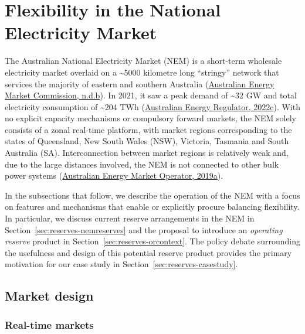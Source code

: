 \documentclass[12pt,a4paper,]{report}
\begin{document}
\hypertarget{sec:reserves-flexnem}{%
\section{Flexibility in the National Electricity
Market}\label{sec:reserves-flexnem}}

The Australian National Electricity Market (NEM) is a short-term
wholesale electricity market overlaid on a \textasciitilde5000 kilometre
long ``stringy'' network that services the majority of eastern and
southern Australia
(\protect\hyperlink{ref-australianenergymarketcommissionElectricitySupplyChain}{Australian
Energy Market Commission, n.d.b}). In 2021, it saw a peak demand of
\textasciitilde32 GW and total electricity consumption of
\textasciitilde204 TWh
(\protect\hyperlink{ref-australianenergyregulatorStateEnergyMarket2022}{Australian
Energy Regulator, 2022c}). With no explicit capacity mechanisms or
compulsory forward markets, the NEM solely consists of a zonal real-time
platform, with market regions corresponding to the states of Queensland,
New South Wales (NSW), Victoria, Tasmania and South Australia (SA).
Interconnection between market regions is relatively weak and, due to
the large distances involved, the NEM is not connected to other bulk
power systems
(\protect\hyperlink{ref-australianenergymarketoperatorMaintainingPowerSystem2019}{Australian
Energy Market Operator, 2019a}).

In the subsections that follow, we describe the operation of the NEM
with a focus on features and mechanisms that enable or explicitly
procure balancing flexibility. In particular, we discuss current reserve
arrangements in the NEM in Section~\ref{sec:reserves-nemreserves} and
the proposal to introduce an \emph{operating reserve} product in
Section~\ref{sec:reserves-orcontext}. The policy debate surrounding the
usefulness and design of this potential reserve product provides the
primary motivation for our case study in
Section~\ref{sec:reserves-casestudy}.

\hypertarget{market-design}{%
\subsection{Market design}\label{market-design}}

\hypertarget{real-time-markets}{%
\subsubsection{Real-time markets}\label{real-time-markets}}
\end{document}
